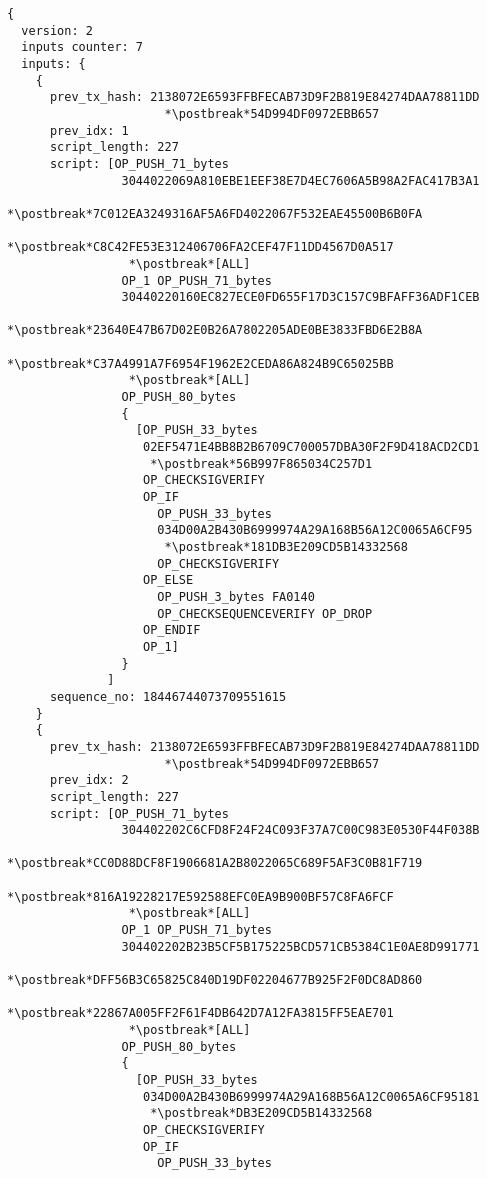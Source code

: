 \begin{lstlisting}
{
  version: 2
  inputs counter: 7
  inputs: {
    {
      prev_tx_hash: 2138072E6593FFBFECAB73D9F2B819E84274DAA78811DD
                      *\postbreak*54D994DF0972EBB657
      prev_idx: 1
      script_length: 227
      script: [OP_PUSH_71_bytes
                3044022069A810EBE1EEF38E7D4EC7606A5B98A2FAC417B3A1
                 *\postbreak*7C012EA3249316AF5A6FD4022067F532EAE45500B6B0FA
                 *\postbreak*C8C42FE53E312406706FA2CEF47F11DD4567D0A517
                 *\postbreak*[ALL]
                OP_1 OP_PUSH_71_bytes
                30440220160EC827ECE0FD655F17D3C157C9BFAFF36ADF1CEB
                 *\postbreak*23640E47B67D02E0B26A7802205ADE0BE3833FBD6E2B8A
                 *\postbreak*C37A4991A7F6954F1962E2CEDA86A824B9C65025BB
                 *\postbreak*[ALL]
                OP_PUSH_80_bytes
                {
                  [OP_PUSH_33_bytes
                   02EF5471E4BB8B2B6709C700057DBA30F2F9D418ACD2CD1
                    *\postbreak*56B997F865034C257D1
                   OP_CHECKSIGVERIFY
                   OP_IF
                     OP_PUSH_33_bytes
                     034D00A2B430B6999974A29A168B56A12C0065A6CF95
                      *\postbreak*181DB3E209CD5B14332568
                     OP_CHECKSIGVERIFY
                   OP_ELSE
                     OP_PUSH_3_bytes FA0140
                     OP_CHECKSEQUENCEVERIFY OP_DROP
                   OP_ENDIF
                   OP_1]
                }
              ]
      sequence_no: 18446744073709551615
    }
    {
      prev_tx_hash: 2138072E6593FFBFECAB73D9F2B819E84274DAA78811DD
                      *\postbreak*54D994DF0972EBB657
      prev_idx: 2
      script_length: 227
      script: [OP_PUSH_71_bytes
                304402202C6CFD8F24F24C093F37A7C00C983E0530F44F038B
                 *\postbreak*CC0D88DCF8F1906681A2B8022065C689F5AF3C0B81F719
                 *\postbreak*816A19228217E592588EFC0EA9B900BF57C8FA6FCF
                 *\postbreak*[ALL]
                OP_1 OP_PUSH_71_bytes
                304402202B23B5CF5B175225BCD571CB5384C1E0AE8D991771
                 *\postbreak*DFF56B3C65825C840D19DF02204677B925F2F0DC8AD860
                 *\postbreak*22867A005FF2F61F4DB642D7A12FA3815FF5EAE701
                 *\postbreak*[ALL]
                OP_PUSH_80_bytes
                {
                  [OP_PUSH_33_bytes
                   034D00A2B430B6999974A29A168B56A12C0065A6CF95181
                    *\postbreak*DB3E209CD5B14332568
                   OP_CHECKSIGVERIFY
                   OP_IF
                     OP_PUSH_33_bytes

\end{lstlisting}
